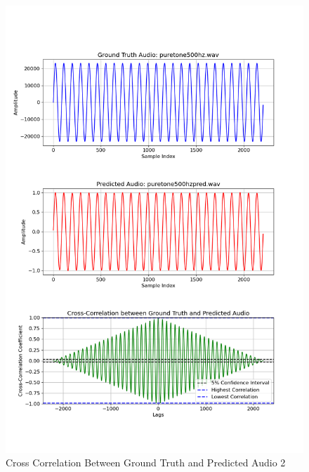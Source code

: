 \documentclass{ioereport}
\begin{document}
    \begin{figure}[H]
        \centering
        \includegraphics[width=\linewidth]{assets/crosscorrelation/cross_correlation_puretone500hz.wav_puretone500hzpred.wav.png}
        \caption{Cross Correlation Between Ground Truth and Predicted Audio 2}
        \label{fig:cross-correlation-2}
    \end{figure}
\end{document}

